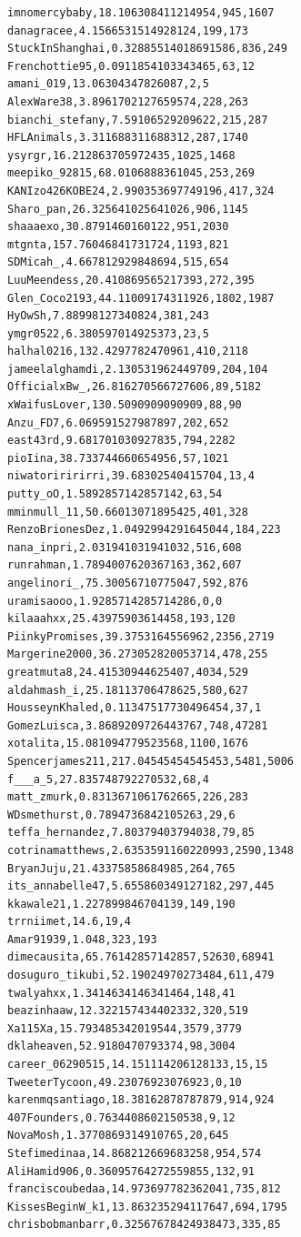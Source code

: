 \begin{verbatim}
imnomercybaby,18.106308411214954,945,1607
danagracee,4.1566531514928124,199,173
StuckInShanghai,0.32885514018691586,836,249
Frenchottie95,0.0911854103343465,63,12
amani_019,13.06304347826087,2,5
AlexWare38,3.8961702127659574,228,263
bianchi_stefany,7.59106529209622,215,287
HFLAnimals,3.311688311688312,287,1740
ysyrgr,16.212863705972435,1025,1468
meepiko_92815,68.0106888361045,253,269
KANIzo426KOBE24,2.990353697749196,417,324
Sharo_pan,26.325641025641026,906,1145
shaaaexo,30.8791460160122,951,2030
mtgnta,157.76046841731724,1193,821
SDMicah_,4.667812929848694,515,654
LuuMeendess,20.410869565217393,272,395
Glen_Coco2193,44.11009174311926,1802,1987
HyOwSh,7.88998127340824,381,243
ymgr0522,6.380597014925373,23,5
halhal0216,132.4297782470961,410,2118
jameelalghamdi,2.130531962449709,204,104
OfficialxBw_,26.816270566727606,89,5182
xWaifusLover,130.5090909090909,88,90
Anzu_FD7,6.069591527987897,202,652
east43rd,9.681701030927835,794,2282
pioIina,38.733744660654956,57,1021
niwatoriririrri,39.68302540415704,13,4
putty_oO,1.5892857142857142,63,54
mminmull_11,50.66013071895425,401,328
RenzoBrionesDez,1.0492994291645044,184,223
nana_inpri,2.031941031941032,516,608
runrahman,1.7894007620367163,362,607
angelinori_,75.30056710775047,592,876
uramisaooo,1.9285714285714286,0,0
kilaaahxx,25.43975903614458,193,120
PiinkyPromises,39.3753164556962,2356,2719
Margerine2000,36.273052820053714,478,255
greatmuta8,24.41530944625407,4034,529
aldahmash_i,25.18113706478625,580,627
HousseynKhaled,0.11347517730496454,37,1
GomezLuisca,3.8689209726443767,748,47281
xotalita,15.081094779523568,1100,1676
Spencerjames211,217.04545454545453,5481,5006
f___a_5,27.835748792270532,68,4
matt_zmurk,0.8313671061762665,226,283
WDsmethurst,0.7894736842105263,29,6
teffa_hernandez,7.80379403794038,79,85
cotrinamatthews,2.6353591160220993,2590,1348
BryanJuju,21.43375858684985,264,765
its_annabelle47,5.655860349127182,297,445
kkawale21,1.227899846704139,149,190
trrniimet,14.6,19,4
Amar91939,1.048,323,193
dimecausita,65.76142857142857,52630,68941
dosuguro_tikubi,52.19024970273484,611,479
twalyahxx,1.3414634146341464,148,41
beazinhaaw,12.322157434402332,320,519
Xa115Xa,15.793485342019544,3579,3779
dklaheaven,52.9180470793374,98,3004
career_06290515,14.151114206128133,15,15
TweeterTycoon,49.23076923076923,0,10
karenmqsantiago,18.38162878787879,914,924
407Founders,0.7634408602150538,9,12
NovaMosh,1.3770869314910765,20,645
Stefimedinaa,14.868212669683258,954,574
AliHamid906,0.36095764272559855,132,91
franciscoubedaa,14.973697782362041,735,812
KissesBeginW_k1,13.863235294117647,694,1795
chrisbobmanbarr,0.32567678424938473,335,85

\end{verbatim}
